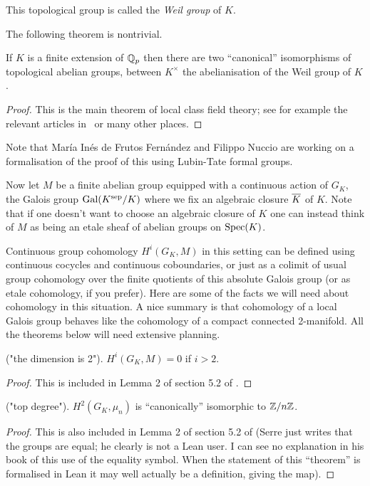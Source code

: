 \begin{definition}\label{local_Weil_group} This topological group is called the \emph{Weil group} of $K$.
\end{definition}

The following theorem is nontrivial.

\begin{theorem} If $K$ is a finite extension of $\mathbb{Q}_p$ then there are two ``canonical'' isomorphisms of topological abelian groups, between $K^\times$ the abelianisation of the Weil group of $K$.
\end{theorem}
\begin{proof} This is the main theorem of local class field theory; see for example the relevant articles in~\cite{cf} or many other places.
\end{proof}

Note that Mar\'ia In\'es de Frutos Fern\'andez and Filippo Nuccio are working on a formalisation of the proof of this using Lubin-Tate formal groups.

Now let $M$ be a finite abelian group equipped with a continuous action of $G_K$, the Galois group $\operatorname{Gal}(K^{\operatorname{sep}}/K)$ where we fix an algebraic closure $\overline{K}$ of $K$. Note that if one doesn't want to choose an algebraic closure of $K$ one can instead think of $M$ as being an etale sheaf of abelian groups on $\operatorname{Spec}(K)$.

Continuous group cohomology $H^i(G_K,M)$ in this setting can be defined using continuous cocycles and continuous coboundaries, or just as a colimit of usual group cohomology over the finite quotients of this absolute Galois group (or as etale cohomology, if you prefer). Here are some of the facts we will need about cohomology in this situation. A nice summary is that cohomology of a local Galois group behaves like the cohomology of a compact connected 2-manifold. All the theorems below will need extensive planning.

\begin{theorem} ("the dimension is 2"). $H^i(G_K,M)=0$ if $i>2$.
\end{theorem}
\begin{proof} This is included in Lemma 2 of section 5.2 of \cite{serre-galcoh}.
\end{proof}

\begin{theorem} ("top degree"). $H^2(G_K,\mu_n)$ is ``canonically'' isomorphic to $\mathbb{Z}/n\mathbb{Z}$.
\end{theorem}
\begin{proof} This is also included in Lemma 2 of section 5.2 of \cite{serre-galcoh} (Serre just writes that the groups are equal; he clearly is not a Lean user. I can see no explanation in his book of this use of the equality symbol. When the statement of this ``theorem'' is formalised in Lean it may well actually be a definition, giving the map).
\end{proof}

